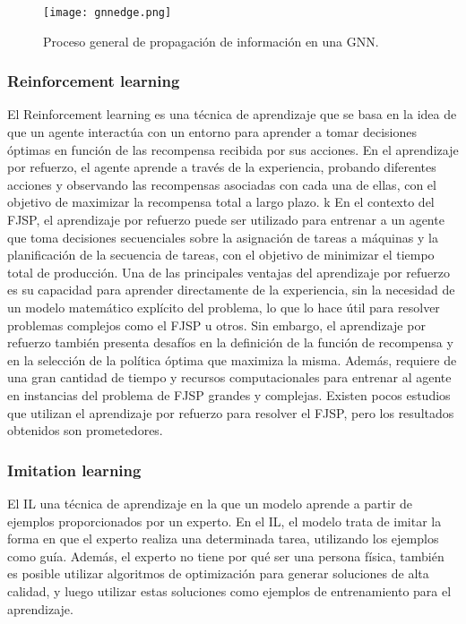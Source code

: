 \begin{figure}[ht]
      \centering
      \texttt{[image: gnnedge.png]}
      \caption{Proceso general de propagación de información en una GNN\cite{DeepFindr_2021}.}\label{fig:gnn-edge}
\end{figure}

\subsubsection{Reinforcement learning}
El Reinforcement learning\cite{Bhatt_2018}\cite{Huggingface_DeepRL} es una
técnica de aprendizaje que se basa en la idea de que un agente interactúa con
un entorno para aprender a tomar decisiones óptimas en función de las
recompensa recibida por sus acciones. En el aprendizaje por refuerzo, el agente
aprende a través de la experiencia, probando diferentes acciones y observando
las recompensas asociadas con cada una de ellas, con el objetivo de maximizar
la recompensa total a largo plazo.\medskip
k
En el contexto del FJSP, el aprendizaje por refuerzo puede ser utilizado para
entrenar a un agente que toma decisiones secuenciales sobre la asignación de
tareas a máquinas y la planificación de la secuencia de tareas, con el objetivo
de minimizar el tiempo total de producción. Una de las principales ventajas del
aprendizaje por refuerzo es su capacidad para aprender directamente de la
experiencia, sin la necesidad de un modelo matemático explícito del problema,
lo que lo hace útil para resolver problemas complejos como el FJSP u otros. Sin
embargo, el aprendizaje por refuerzo también presenta desafíos en la definición
de la función de recompensa y en la selección de la política óptima que
maximiza la misma. Además, requiere de una gran cantidad de tiempo y recursos
computacionales para entrenar al agente en instancias del problema de FJSP
grandes y complejas. Existen pocos estudios que utilizan el aprendizaje por
refuerzo para resolver el FJSP, pero los resultados obtenidos son prometedores.

\subsubsection{Imitation learning}
El IL\cite{SmartLab_2019} una técnica de aprendizaje en la que un modelo aprende a partir de 
ejemplos proporcionados por un experto. En el IL, el modelo trata de imitar 
la forma en que el experto realiza una determinada tarea, utilizando los 
ejemplos como guía. Además, el experto no tiene por qué ser una persona física, 
también es posible utilizar algoritmos de optimización para generar soluciones 
de alta calidad, y luego utilizar estas soluciones como ejemplos de entrenamiento 
para el aprendizaje.\medskip

